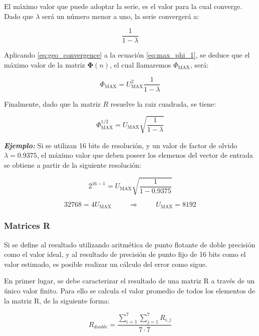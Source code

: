 El máximo valor que puede adoptar la serie, es el valor para la cual converge. Dado que $\lambda$ será un número menor a uno, la serie convergerá a:

\begin{equation}
\label{eq:geo_convergence}
\frac{1}{1-\lambda}
\end{equation}

Aplicando \ref{eq:geo_convergence} a la ecuación \ref{eq:max_phi_1}, se deduce que el máximo valor de la matriz $\mathbf{\Phi}(n)$, el cual llamaremos $\Phi_{\text{MAX}}$, será:

\begin{equation}
\Phi_{\text{MAX}} = U_{\text{MAX}}^2 \frac{1}{1-\lambda}
\end{equation}

Finalmente, dado que la matriz $R$ resuelve la raiz cuadrada, se tiene:

\begin{equation}
\Phi_{\text{MAX}}^{1/2} = U_{\text{MAX}} \sqrt{\frac{1}{1-\lambda}}
\end{equation}

\textit{\textbf{Ejemplo:}} Si se utilizan 16 bits de resolución, y un valor de factor de olvido $\lambda = 0.9375$, el máximo valor que deben poseer los elemenos del vector de entrada se obtiene a partir de la siguiente resolución:

\begin{equation}
2^{16-1} = U_{\text{MAX}} \sqrt{\frac{1}{1-0.9375}}
\end{equation}

\[
32768 = 4 U_{\text{MAX}} \hspace{1cm} \Longrightarrow \hspace{1cm} U_{\text{MAX}} = 8192
\]

\subsubsection{Matrices R}

Si se define al resultado utilizando aritmética de punto flotante de doble precisión como el valor ideal, y al resultado de precisión de punto fijo de 16 bits como el valor estimado, es posible realizar un cálculo del error como sigue.

En primer lugar, se debe caracterizar el resultado de una matriz R a través de un único valor finito. Para ello se calcula el valor promedio de todos los elementos de la matriz R, de la siguiente forma:

\begin{equation}
    R_{double} = \frac{\sum_{i=1}^{7}\sum_{j=1}^{7} R_{i,j}}{7 \cdot 7}
\end{equation}

